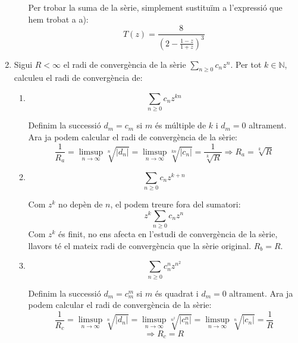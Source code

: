 \documentclass[10pt,a4paper]{article}
\begin{document}
\begin{enumerate}
\begin{enumerate}
\begin{framed}
	Per trobar la suma de la sèrie, simplement sustituïm a l'expressió que hem trobat a a):
	$$T(z) = \frac{8}{\left(2-\frac{1-z}{1+z}\right)^{3}}$$
	\end{framed}	
	\end{enumerate}
\newpage
\item Sigui $R<\infty$ el radi de convergència de la sèrie $\sum_{n\geq 0}c_{n}z^{n}$. Per tot $k\in\mathbb{N}$, calculeu el radi de convergència de:
	\begin{enumerate}
	\item $$\sum_{n\geq 0}c_{n}z^{kn}$$
	
	\begin{framed}
	
	Definim la successió $d_{m} = c_{m}$ si $m$ és múltiple de $k$ i $d_{m} = 0$ altrament. Ara ja podem calcular el radi de convergència de la sèrie:
	$$\frac{1}{R_{a}} = \limsup_{n\rightarrow\infty} \sqrt[n]{|d_{n}|} = \limsup_{n\rightarrow\infty} \sqrt[kn]{|c_{n}|} = \frac{1}{\sqrt[k]{R}} \Rightarrow R_{a}=\sqrt[k]{R}$$
	\end{framed}
	
	\item $$\sum_{n\geq 0}c_{n}z^{k+n}$$
	
	\begin{framed}
	Com $z^{k}$ no depèn de $n$, el podem treure fora del sumatori:
	$$z^{k}\sum_{n\geq 0}c_{n}z^{n}$$
	Com $z^{k}$ és finit, no ens afecta en l'estudi de convergència de la sèrie, llavors té el mateix radi de convergència que la sèrie original. $R_{b}=R$.	
	\end{framed}	
	\item $$\sum_{n\geq 0}c_{n}^{n}z^{n^{2}}$$
	
	\begin{framed}
	Definim la successió $d_{m} = c_{m}^{m}$ si $m$ és quadrat i $d_{m}=0$ altrament. Ara ja podem calcular el radi de convergència de la sèrie:
	$$\frac{1}{R_{c}} = \limsup_{n\rightarrow\infty} \sqrt[n]{|d_{n}|} = \limsup_{n\rightarrow\infty} \sqrt[n^{2}]{|c_{n}^{n}|} = \limsup_{n\rightarrow\infty} \sqrt[n]{|c_{n}|} = \frac{1}{R}$$ 
	$$\Rightarrow R_{c}=R$$
	\end{framed}
	\end{enumerate}
	
\end{enumerate}
\end{document}
